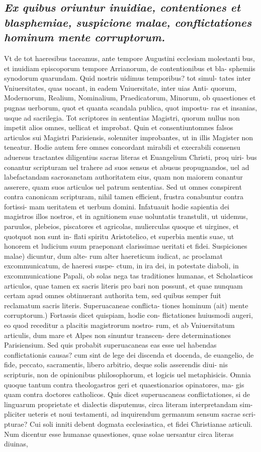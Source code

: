 \documentclass{article}
\begin{document}
\begin{pages}
\subsection*{\textit{Ex quibus oriuntur inuidiae, contentiones et blasphemiae, suspicione malae, conflictationes hominum mente corruptorum. }}\pstart Vt de tot haeresibus taceamus, ante tempore Augustini ecclesiam molestanti bus, et inuidiam episcoporum tempore Arrianorum, de contentionibus et bla- sphemiis synodorum quarundam. Quid nostris uidimus temporibus? tot simul- tates inter Vniuersitates, quas uocant, in eadem Vniuersitate, inter uias Anti- quorum, Modernorum, Realium, Nominalium, Praedicatorum, Minorum, ob quaestiones et pugnas uerborum, quot et quanta scandala publica, quot impostu- ras et insanias, usque ad sacrilegia. Tot scriptores in sententias Magistri, quorum nullus non impetit alios omnes, uellicat et improbat. Quin et consentiuntomnes falsos articulos sui Magistri Parisiensis, solenniter improbantes, ut in illis Magister non teneatur. Hodie autem fere omnes concordant mirabili et execrabili consensu aduersus tractantes diligentius sacras literas et Euangelium Christi, proq uiri- bus conantur scripturam uel trahere ad suos sensus et abusus propugnandos, uel ad labefactandam sacrosanctam authoritatem eius, quam non maiorem conantur asserere, quam suos articulos uel patrum sententias. Sed ut omnes conspirent contra canonicam scripturam, nihil tamen efficient, frustra conabuntur contra fortissi- mam ueritatem et uerbum domini. Infatuauit hodie sapientia dei magistros illos nostros, et in agnitionem suae uoluntatis transtulit, ut uidemus, paruulos, plebeios, piscatores et agricolas, mulierculas quoque et uirgines, et quotquot non sunt in- flati spiritu Aristotelico, et superbia mentis suae, ut honorem et ludicium suum praeponant clarissimae ueritati et fidei. Suspiciones malae) dicuntur, dum alte- rum alter haereticum iudicat, ac proclamat excommunicatum, de haeresi suspe- ctum, in ira dei, in potestate diaboli, in excommunicatione Papali, ob solas nega tas traditiones humanas, et Scholasticos articulos, quae tamen ex sacris literis pro bari non possunt, et quae nunquam certam apud omnes obtinuerant authorita tem, sed quibus semper fuit reclamatum sacris literis. Superuacaneae conflicta- tiones hominum (ait) mente corruptorum.) Fortassis dicet quispiam, hodie con- flictationes huiusmodi augeri, eo quod receditur a placitis magistrorum nostro- rum, et ab Vniuersitatum articulis, dum mare et Alpes non sinuntur transcen- dere determinationes Parisiensium. Sed quis probabit superuacaneas eas esse uel habendas conflictationis causas? cum sint de lege dei discenda et docenda, de euangelio, de fide, peccato, sacramentis, libero arbitrio, deque solis asserendis diui- nis scripturis, non de opinionibus philosophorum, et logicis uel metaphisicis. Omnia quoque tantum contra theologastros geri et quaestionarios opinatores, ma- gis quam contra doctores catholicos. Quis dicet superuacaneas conflictationes, si de linguarum proprietate et dialectis disputemus, circa literam interpretandam sim- pliciter ueteris et noui testamenti, ad inquirendum germanum sensum sacrae scri- pturae? Cui soli inniti debent dogmata ecclesiastica, et fidei Christianae articuli. Num dicentur esse humanae quaestiones, quae solae uersantur circa literas diuinas,  \pend

\end{pages}
\end{document}
